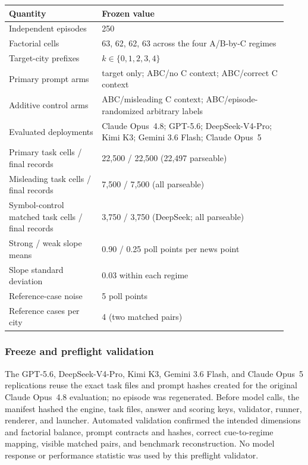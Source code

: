 \begin{center}
\begin{minipage}{\linewidth}
\centering
{}
\label{tab:coin-city-design}
\small
\begin{tabular}{p{0.31\linewidth} p{0.62\linewidth}}
\toprule
Quantity & Frozen value \\
\midrule
Independent episodes & 250 \\
Factorial cells & 63, 62, 62, 63 across the four A/B-by-C regimes \\
Target-city prefixes & \(k\in\{0,1,2,3,4\}\) \\
Primary prompt arms & target only; ABC/no C context; ABC/correct C context \\
Additive control arms & ABC/misleading C context; ABC/episode-randomized arbitrary labels \\
Evaluated deployments & Claude Opus~4.8; GPT-5.6; DeepSeek-V4-Pro; Kimi K3; Gemini 3.6 Flash; Claude Opus~5 \\
Primary task cells / final records & 22,500 / 22,500 (22,497 parseable) \\
Misleading task cells / final records & 7,500 / 7,500 (all parseable) \\
Symbol-control matched task cells / final records & 3,750 / 3,750 (DeepSeek; all parseable) \\
Strong / weak slope means & 0.90 / 0.25 poll points per news point \\
Slope standard deviation & 0.03 within each regime \\
Reference-case noise & 5 poll points \\
Reference cases per city & 4 (two matched pairs) \\
\bottomrule
\end{tabular}
\end{minipage}
\end{center}

\subsubsection{Freeze and preflight validation}
The GPT-5.6, DeepSeek-V4-Pro, Kimi K3, Gemini 3.6 Flash, and Claude Opus~5
replications reuse the exact task files and prompt hashes created for the original
Claude Opus~4.8 evaluation; no episode was regenerated. Before model calls, the
manifest hashed the engine, task files, answer and scoring keys, validator, runner,
renderer, and launcher. Automated validation confirmed the intended dimensions and
factorial balance, prompt contracts and hashes, correct cue-to-regime mapping,
visible matched pairs, and benchmark reconstruction. No model response or
performance statistic was used by this preflight validator.

